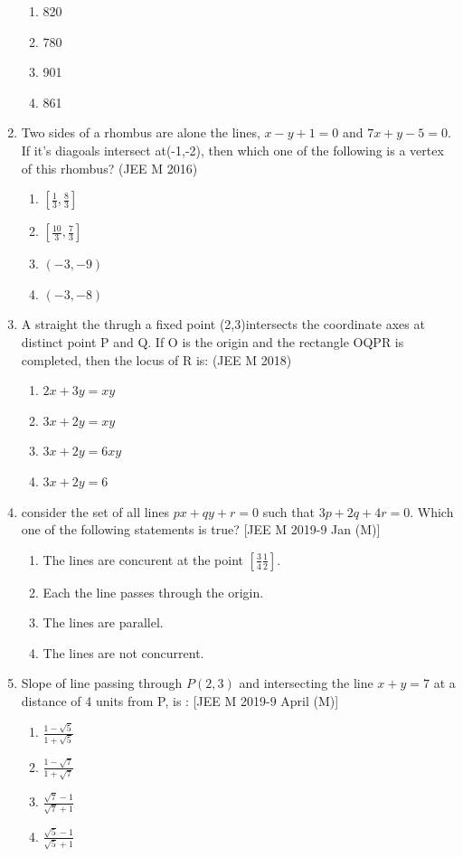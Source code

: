 \documentclass[12pt]{article}
\begin{document}
\begin{enumerate}
\begin{enumerate}
\item 820 
\item 780 
\item 901 
\item 861
\end{enumerate}
\item Two sides  of a rhombus are alone the lines, $x-y+1=0$ and $7x+y-5=0$. If it's diagoals intersect at(-1,-2), then which one of the following is a vertex of this rhombus? (JEE M 2016)
\begin{enumerate}
\item $\left[ \frac{1}{3},\frac{8}{3}\right]$ 
\item $\left[ \frac{10}{3},\frac{7}{3}\right]$ 
\item $(-3,-9)$ 
\item $(-3,-8)$
\end{enumerate}
\item A straight the thrugh a fixed point (2,3)intersects the coordinate axes at distinct point P  and Q. If O is the origin and the rectangle OQPR is completed, then the locus of R is: (JEE M 2018)
\begin{enumerate}
\item $2x+3y=xy$ 
\item $3x+2y=xy$ 
\item $3x+2y=6xy$ 
\item $3x+2y=6$
\end{enumerate}
\item consider the set of all lines $px+qy+r=0$ such that $3p+2q+4r=0$. Which one of the following statements is true? [JEE M 2019-9 Jan (M)]
\begin{enumerate}
\item The lines are concurent at the point $\left[\frac{3}{4}\frac{1}{2}\right] $.
\item Each the line passes through the origin.
\item The lines are parallel.
\item The lines are not concurrent.
\end{enumerate}
\item Slope of line passing through $P(2,3)$ and intersecting the line $x+y=7$ at a distance of 4 units from  P,  is : [JEE M 2019-9 April (M)]
\begin{enumerate}
\item $\frac{1-\sqrt{5}}{1+\sqrt{5}}$
\item $\frac{1-\sqrt{7}}{1+\sqrt{7}}$
\item $\frac{\sqrt{7}-1}{\sqrt{7}+1}$
\item $\frac{\sqrt{5}-1}{\sqrt{5}+1}$
\end{enumerate}
\end{enumerate}
\end{document}
